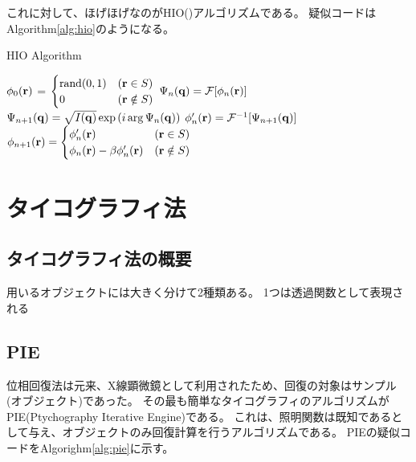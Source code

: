 これに対して、ほげほげなのがHIO()アルゴリズムである。
疑似コードはAlgorithm\ref{alg:hio}のようになる。

\begin{algorithm}                      
\caption{HIO Algorithm}         
\label{alg:hio}                          
\begin{algorithmic}
    \STATE $\phi_0(\mathbf{r})$
      = $\begin{cases}
        \mathrm{rand}(0,1) & (\mathbf{r} \in S) \\
        0 & (\mathbf{r} \notin S)
      \end{cases}$
    \STATE $\Psi_n(\mathbf{q}) = \mathcal F [\phi_n(\mathbf{r})]$
    \STATE $\Psi_{n+1}(\mathbf{q}) = \sqrt{I(\mathbf{q})} \exp \left( i \arg \Psi_n(\mathbf{q}) \right)$ 
    \STATE $\phi_n'(\mathbf{r}) = \mathcal F^{-1} [\Psi_{n+1}(\mathbf{q})]$
    \STATE $\phi_{n+1}(\mathbf{r})
      = \begin{cases}
          \phi_n'(\mathbf{r}) & (\mathbf{r} \in S) \\
          \phi_n(\mathbf{r}) - \beta \phi_n'(\mathbf{r}) & (\mathbf{r} \notin S)
      \end{cases}$
    \ENDFOR
\end{algorithmic}
\end{algorithm}

\clearpage
\newpage

\section{タイコグラフィ法}
\subsection{タイコグラフィ法の概要}
用いるオブジェクトには大きく分けて2種類ある。
1つは透過関数として表現される

\subsection{PIE}
位相回復法は元来、X線顕微鏡として利用されたため、回復の対象はサンプル(オブジェクト)であった。
その最も簡単なタイコグラフィのアルゴリズムがPIE(Ptychography Iterative Engine)である。
これは、照明関数は既知であるとして与え、オブジェクトのみ回復計算を行うアルゴリズムである。
PIEの疑似コードをAlgorighm\ref{alg:pie}に示す。

